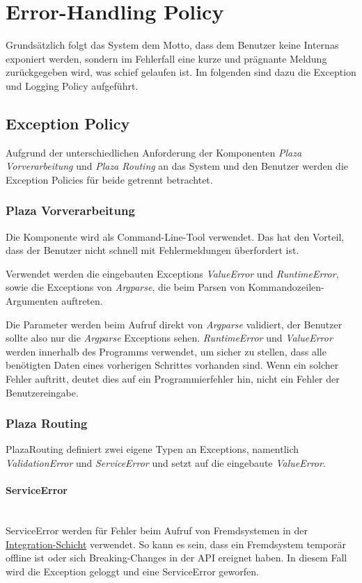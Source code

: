 
\section{Error-Handling Policy}
\label{sec:Error-Handling Policy}
Grundsätzlich folgt das System dem Motto, dass dem Benutzer keine Internas exponiert werden, sondern im Fehlerfall eine kurze und prägnante Meldung zurückgegeben wird, was schief gelaufen ist. Im folgenden sind dazu die Exception und Logging Policy aufgeführt.

\subsection{Exception Policy}
\label{ehp:Exception Policy}
Aufgrund der unterschiedlichen Anforderung der Komponenten \emph{Plaza Vorverarbeitung} und \emph{Plaza Routing} an das System und den Benutzer werden die Exception Policies für beide getrennt betrachtet.

\subsubsection{Plaza Vorverarbeitung}
\label{ehp:Plaza Vorverarbeitung}
Die Komponente wird als Command-Line-Tool verwendet. Das hat den Vorteil, dass der Benutzer nicht schnell mit Fehlermeldungen überfordert ist. 

Verwendet werden die eingebauten Exceptions \emph{ValueError} und \emph{RuntimeError}, sowie die Exceptions von \emph{Argparse}, die beim Parsen von Kommandozeilen-Argumenten auftreten.

Die Parameter werden beim Aufruf direkt von \emph{Argparse} validiert, der Benutzer sollte also nur die \emph{Argparse} Exceptions sehen. \emph{RuntimeError} und \emph{ValueError} werden innerhalb des Programms verwendet, um sicher zu stellen, dass alle benötigten Daten eines vorherigen Schrittes vorhanden sind. Wenn ein solcher Fehler auftritt, deutet dies auf ein Programmierfehler hin, nicht ein Fehler der Benutzereingabe.

\subsubsection{Plaza Routing}
\label{ehp:Plaza Routing}
PlazaRouting definiert zwei eigene Typen an Exceptions, namentlich \emph{ValidationError} und \emph{ServiceError} und setzt auf die eingebaute \emph{ValueError}. 

\paragraph{ServiceError}\label{ehp:PR:ServiceError}~\\
ServiceError werden für Fehler beim Aufruf von Fremdsystemen in der \hyperref[architektur:integration-layer]{Integration-Schicht} verwendet. So kann es sein, dass ein Fremdsystem temporär offline ist oder sich Breaking-Changes in der \ac{API} ereignet haben. In diesem Fall wird die Exception geloggt und eine ServiceError geworfen.

